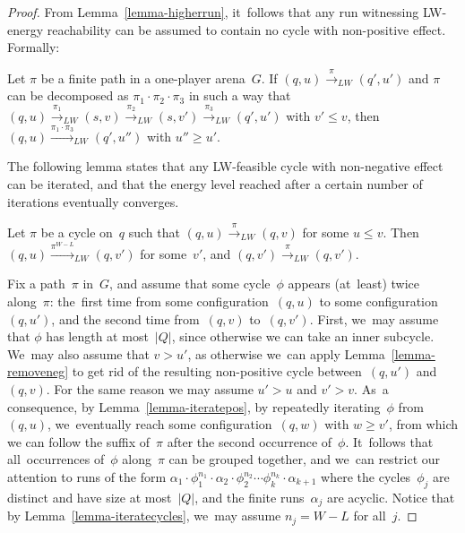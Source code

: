 \begin{proof}
From Lemma~\ref{lemma-higherrun}, it~follows that any run witnessing
LW-energy reachability can be assumed to contain no cycle with
non-positive effect. Formally:

\vskip 0.5cm
\begin{lemma}
\label{lemma-removeneg}
  Let $\pi$ be a finite path in a one-player arena~$G$.
  If $(q,u) \xrightarrow{\pi}_{LW} (q',u')$ and $\pi$ can be decomposed as
  $\pi_1\cdot\pi_2\cdot \pi_3$ in such a way that
  $(q,u) \xrightarrow{\pi_1}_{LW}
  (s,v)\xrightarrow{\pi_2}_{LW}(s,v') \xrightarrow{\pi_3}_{LW}(q',u')$ with $v'\leq
  v$, then $(q,u)\xrightarrow{\pi_1\cdot\pi_3}_{LW} (q',u'')$ with $u''\geq
  u'$.
\end{lemma}


The following lemma states that any LW-feasible cycle with
non-negative effect can be iterated, and that the energy level reached after a certain number of  iterations
eventually converges.
\vskip 0.5cm
\begin{lemma}\label{lemma-iteratecycles}
  Let $\pi$ be a cycle on~$q$ such that $(q,u) \xrightarrow{\pi}_{LW} (q,v)$
  for some $u\leq v$. Then $(q,u) \xrightarrow{\pi^{W-L}}_{LW} (q,v')$ for
  some~$v'$, and $(q,v')\xrightarrow{\pi}_{LW} (q,v')$.
\end{lemma}


Fix a path~$\pi$ in~$G$, and assume that some cycle~$\phi$ appears
(at~least) twice along~$\pi$: the~first time from some
configuration~$(q,u)$ to some configuration~$(q,u')$, and the second
time from~$(q,v)$ to~$(q,v')$. First, we~may assume that $\phi$ has
length at most~$|Q|$, since otherwise we can take an inner
subcycle.  We~may also assume that $v>u'$, as otherwise we~can apply
Lemma~\ref{lemma-removeneg} to get rid of the resulting non-positive cycle between~$(q,u')$ and~$(q,v)$. For the same reason we may assume
$u'>u$ and $v'>v$.  As~a consequence, by Lemma~\ref{lemma-iteratepos},
by repeatedly iterating~$\phi$ 
from~$(q,u)$, we~eventually reach some
configuration~$(q,w)$ with $w\geq v'$, from which we can follow the
suffix of~$\pi$ after the second occurrence of~$\phi$. It~follows that
all~occurrences of~$\phi$ along~$\pi$ can be grouped together, and
we~can restrict our attention to runs of the form $\alpha_1\cdot
\phi_1^{n_1}\cdot \alpha_2\cdot\phi_2^{n_2}\cdots
\phi_k^{n_k}\cdot\alpha_{k+1}$ where the cycles~$\phi_j$ are distinct
and have size at most~$|Q|$, and the finite runs~$\alpha_j$ are
acyclic.  Notice that by Lemma~\ref{lemma-iteratecycles}, we~may
assume $n_j=W-L$ for all~$j$.





\end{proof}
